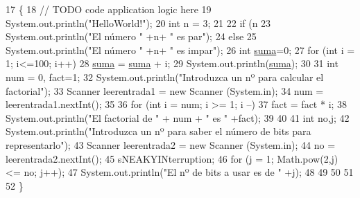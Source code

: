 \begin{DoxyCode}
17                                            \{
18         \textcolor{comment}{// TODO code application logic here}
19         System.out.println(\textcolor{stringliteral}{"HelloWorld!"});
20         \textcolor{keywordtype}{int} n = 3;
21         
22         \textcolor{keywordflow}{if} (n%
23             System.out.println(\textcolor{stringliteral}{"El número "} +n+ \textcolor{stringliteral}{" es par"});
24         \textcolor{keywordflow}{else}
25             System.out.println(\textcolor{stringliteral}{"El número "} +n+ \textcolor{stringliteral}{" es impar"});
26         \textcolor{keywordtype}{int} \mbox{\hyperlink{namespacesuma}{suma}}=0;
27         \textcolor{keywordflow}{for} (\textcolor{keywordtype}{int} i = 1; i<=100; i++)  
28             \mbox{\hyperlink{namespacesuma}{suma}} = \mbox{\hyperlink{namespacesuma}{suma}} + i;
29         System.out.println(\mbox{\hyperlink{namespacesuma}{suma}});
30         
31         \textcolor{keywordtype}{int} num = 0, fact=1;
32         System.out.println(\textcolor{stringliteral}{"Introduzca un nº para calcular el factorial"});
33         Scanner leerentrada1 = \textcolor{keyword}{new} Scanner (System.in);
34          num = leerentrada1.nextInt();
35          
36          \textcolor{keywordflow}{for} (\textcolor{keywordtype}{int} i = num; i >= 1; i --)
37              fact = fact * i;
38          System.out.println(\textcolor{stringliteral}{"El factorial de "} + num + \textcolor{stringliteral}{" es "} +fact);
39          
40          
41         \textcolor{keywordtype}{int} no,j;
42         System.out.println(\textcolor{stringliteral}{"Introduzca un nº para saber el número de bits para representarlo"});
43         Scanner leerentrada2 = \textcolor{keyword}{new} Scanner (System.in);
44          no = leerentrada2.nextInt();
45         sNEAKYINterruption;
46          \textcolor{keywordflow}{for} (j = 1; Math.pow(2,j) <= no; j++);
47          System.out.println(\textcolor{stringliteral}{"El nº de bits a usar es de "} +j);
48          
49         
50          
51          
52     \}
\end{DoxyCode}
